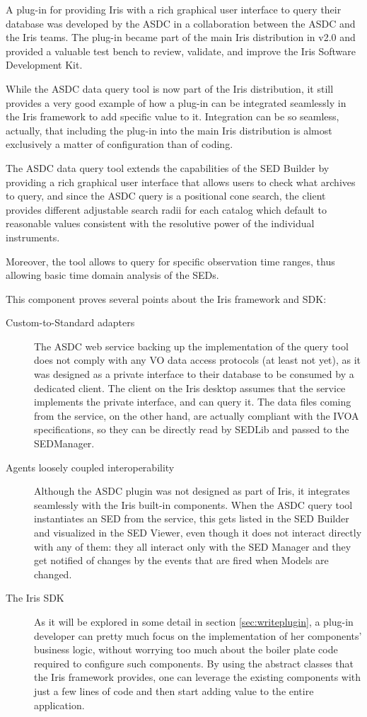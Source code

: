 \documentclass[5p]{elsarticle}
\begin{document}
A plug-in for providing Iris with a rich graphical user interface to query their database was developed by the ASDC in a collaboration between the ASDC and the Iris teams. The plug-in became part of the main Iris distribution in v2.0 and provided a valuable test bench to review, validate, and improve the Iris Software Development Kit.

While the ASDC data query tool is now part of the Iris distribution, it still provides a very good example of how a plug-in can be integrated seamlessly in the Iris framework to add specific value to it. Integration can be so seamless, actually, that including the plug-in into the main Iris distribution is almost exclusively a matter of configuration than of coding.

The ASDC data query tool extends the capabilities of the SED Builder by providing a rich graphical user interface that allows users to check what archives to query, and since the ASDC query is a positional cone search, the client provides different adjustable search radii for each catalog which default to reasonable values consistent with the resolutive power of the individual instruments.

Moreover, the tool allows to query for specific observation time ranges, thus allowing basic time domain analysis of the SEDs.

This component proves several points about the Iris framework and SDK:
\begin{description}
\item[Custom-to-Standard adapters] The ASDC web service backing up the implementation of the query tool does not comply with any VO data access protocols (at least not yet), as it was designed as a private interface to their database to be consumed by a dedicated client. The client on the Iris desktop assumes that the service implements the private interface, and can query it. The data files coming from the service, on the other hand, are actually compliant with the IVOA specifications, so they can be directly read by SEDLib and passed to the SEDManager.
\item[Agents loosely coupled interoperability] Although the ASDC plugin was not designed as part of Iris, it integrates seamlessly with the Iris built-in components. When the ASDC query tool instantiates an SED from the service, this gets listed in the SED Builder and visualized in the SED Viewer, even though it does not interact directly with any of them: they all interact only with the SED Manager and they get notified of changes by the events that are fired when Models are changed.
\item[The Iris SDK] As it will be explored in some detail in section \ref{sec:writeplugin}, a plug-in developer can pretty much focus on the implementation of her components' business logic, without worrying too much about the boiler plate code required to configure such components. By using the abstract classes that the Iris framework
provides, one can leverage the existing components with just a few lines of code and then start adding value to the entire application.
\end{description}
\end{document}
